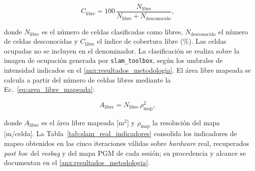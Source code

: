 \begin{equation}
C_{\mathrm{libre}}
=
100\,
\frac{N_{\mathrm{libre}}}
{N_{\mathrm{libre}}+N_{\mathrm{desconocido}}},
\label{eq:cobertura_libre}
\end{equation}

\noindent donde $N_{\mathrm{libre}}$ es el número de celdas clasificadas como
libres, $N_{\mathrm{desconocido}}$ el número de celdas desconocidas y
$C_{\mathrm{libre}}$ el índice de cobertura libre (\%). Las celdas ocupadas no
se incluyen en el denominador. La clasificación se realiza sobre la imagen de
ocupación generada por \texttt{slam\_toolbox}, según los umbrales de
intensidad indicados en el \ref{anx:resultados_metodologia}.
El área libre mapeada se calcula a partir del número de celdas libres mediante
la Ec.~\eqref{eq:area_libre_mapeada}:

\begin{equation}
A_{\mathrm{libre}}
=
N_{\mathrm{libre}}\,\rho_{\mathrm{map}}^2,
\label{eq:area_libre_mapeada}
\end{equation}

\noindent donde $A_{\mathrm{libre}}$ es el área libre mapeada [m$^2$] y
$\rho_{\mathrm{map}}$ la resolución del mapa [m/celda]. La
Tabla~\ref{tab:slam_real_indicadores} consolida los indicadores de mapeo
obtenidos en las cinco iteraciones válidas sobre \textit{hardware} real, recuperados \textit{post hoc} del \textit{rosbag} y del mapa PGM de cada sesión; su procedencia y
alcance se documentan en el \ref{anx:resultados_metodologia}.

